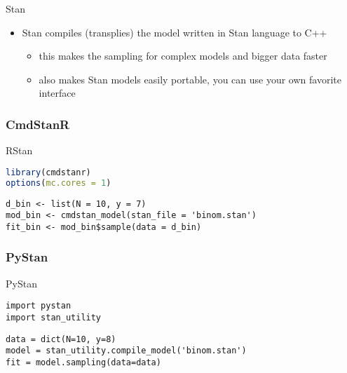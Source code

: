 \documentclass[finnish,english,t]{beamer}
\begin{document}

    

\begin{frame}{Stan}
  
  \begin{itemize}
  \item Stan compiles (transplies) the model written in Stan language to C++
    \begin{itemize}
    \item this makes the sampling for complex models and bigger data faster
    \item also makes Stan models easily portable, you can use your own
      favorite interface
    \end{itemize}
  \end{itemize}

\end{frame}

\begin{frame}[fragile]
  \frametitle{CmdStanR}

  {\small\color{gray}
    {
      RStan
\begin{lstlisting}[language=R]
library(cmdstanr) 
options(mc.cores = 1)
\end{lstlisting}
    }
{
\begin{lstlisting}[]
d_bin <- list(N = 10, y = 7)
mod_bin <- cmdstan_model(stan_file = 'binom.stan')
fit_bin <- mod_bin$sample(data = d_bin)
\end{lstlisting}
}
}
\end{frame}

\begin{frame}[fragile]
  \frametitle{PyStan}

  {\small\color{gray}
{
      PyStan
\begin{lstlisting}
import pystan
import stan_utility
\end{lstlisting}
    }
    {
\begin{lstlisting}
data = dict(N=10, y=8)
model = stan_utility.compile_model('binom.stan')
fit = model.sampling(data=data)
\end{lstlisting}
    }
  }
\end{frame}
\end{document}
